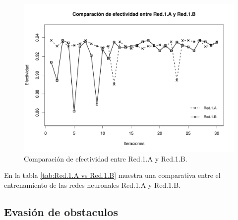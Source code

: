 \documentclass{iccmemoria}
\begin{document}
\begin{figure}[H]
  \centering
  \includegraphics[width = 450pt]{images/net_1_a_vs_net_1_b.pdf}
  \caption[Efectividad de Red.1.A vs Red.1.B.]{Comparación de efectividad entre Red.1.A y Red.1.B.}
  \label{fig:net.1.a vs net.1.b}
\end{figure}

En la tabla \ref{tab:Red.1.A vs Red.1.B} muestra una comparativa entre el entrenamiento de las redes neuronales Red.1.A y Red.1.B.\\

\begin{table}[H]
\caption{Datos comparativos del entrenamiento en Red.1.A  y Red.1.B}
\label{tab:Red.1.A vs Red.1.B}
\end{table}

\subsection{Evasión de obstaculos}
\end{document}
